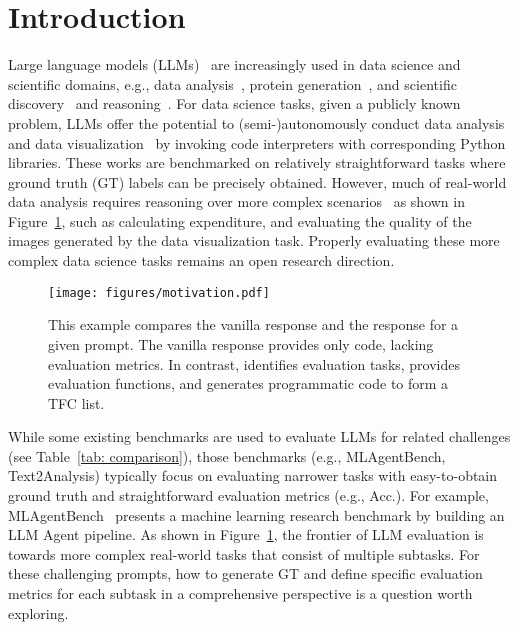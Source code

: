 \section{Introduction}
\label{sec: introduction}
Large language models (LLMs)~\citep{achiam2023gpt, team2023gemini, glm2024chatglm} are increasingly used in data science and scientific domains, e.g., data analysis~\citep{hong2024datainterpreter}, protein generation~\citep{jumper2021highly, chen2024xtrimopglm}, and scientific discovery~\citep{lu2024ai} and reasoning~\citep{zhang2024sciglm, zhang2024rest}.
For data science tasks, given a publicly known problem, LLMs offer the potential to (semi-)autonomously conduct data analysis~\citep{huang2023mlbenchmarking} and data visualization~\citep{hong2024datainterpreter} by invoking code interpreters with corresponding Python libraries.
These works are benchmarked on relatively straightforward tasks where ground truth (GT) labels can be precisely obtained.
However, much of real-world data analysis requires reasoning over more complex scenarios~\citep{chen2024viseval} as shown in Figure~\ref{fig: motivation}, such as calculating expenditure, and evaluating the quality of the images generated by the data visualization task.
Properly evaluating these more complex data science tasks remains an open research direction.

\begin{figure}[t!]
    \centering
    \texttt{[image: figures/motivation.pdf]}
    \vspace{-0.2cm}
    \caption{This example compares the vanilla response and the \benchmark\space response for a given prompt. The vanilla response provides only code, lacking evaluation metrics. In contrast, \benchmark\space identifies evaluation tasks, provides evaluation functions, and generates programmatic code to form a TFC list.}
    \label{fig: motivation}
\end{figure}




While some existing benchmarks are used to evaluate LLMs for related challenges (see Table~\ref{tab: comparison}), those benchmarks (e.g., MLAgentBench, Text2Analysis) typically focus on evaluating narrower tasks with easy-to-obtain ground truth and straightforward evaluation metrics (e.g., Acc.).
For example, MLAgentBench~\citep{huang2023mlbenchmarking} presents a machine learning research benchmark by building an LLM Agent pipeline. 
As shown in Figure~\ref{fig: motivation}, the frontier of LLM evaluation is towards more complex real-world tasks that consist of multiple subtasks. For these challenging prompts, how to generate GT and define specific evaluation metrics for each subtask in a comprehensive perspective is a question worth exploring.


